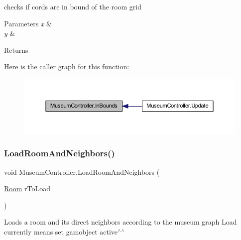 checks if cords are in bound of the room grid 


\begin{DoxyParams}{Parameters}
{\em x} & \\
\hline
{\em y} & \\
\hline
\end{DoxyParams}
\begin{DoxyReturn}{Returns}

\end{DoxyReturn}
Here is the caller graph for this function\+:
\nopagebreak
\begin{figure}[H]
\begin{center}
\leavevmode
\includegraphics[width=350pt]{class_museum_controller_a5b242d5604840f35efb90e4b645829fe_icgraph}
\end{center}
\end{figure}
\mbox{\label{class_museum_controller_a8f4312e1b672427e94e590e499d2ca8d}} 
\subsubsection{\texorpdfstring{Load\+Room\+And\+Neighbors()}{LoadRoomAndNeighbors()}}
{\footnotesize\ttfamily void Museum\+Controller.\+Load\+Room\+And\+Neighbors (\begin{DoxyParamCaption}\item[{\mbox{\hyperlink{class_room}{Room}}}]{r\+To\+Load }\end{DoxyParamCaption})\hspace{0.3cm}{\ttfamily [private]}}



Loads a room and it\textquotesingle{}s direct neighbors according to the museum graph Load currently means set gamobject active$^\wedge$$^\wedge$ 


